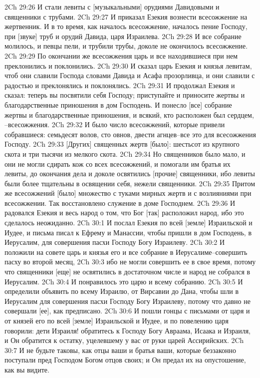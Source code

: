 2Ch 29:26  И стали левиты с [музыкальными] орудиями Давидовыми и священники с трубами.
2Ch 29:27  И приказал Езекия вознести всесожжение на жертвенник. И в то время, как началось всесожжение, началось пение Господу, при [звуке] труб и орудий Давида, царя Израилева.
2Ch 29:28  И все собрание молилось, и певцы пели, и трубили трубы, доколе не окончилось всесожжение.
2Ch 29:29  По окончании же всесожжения царь и все находившиеся при нем преклонились и поклонились.
2Ch 29:30  И сказал царь Езекия и князья левитам, чтоб они славили Господа словами Давида и Асафа прозорливца, и они славили с радостью и преклонялись и поклонялись.
2Ch 29:31  И продолжал Езекия и сказал: теперь вы посвятили себя Господу; приступайте и приносите жертвы и благодарственные приношения в дом Господень. И понесло [все] собрание жертвы и благодарственные приношения, и всякий, кто расположен был сердцем, --всесожжения.
2Ch 29:32  И было число всесожжений, которые привели собравшиеся: семьдесят волов, сто овнов, двести агнцев--все это для всесожжения Господу.
2Ch 29:33  [Других] священных жертв [было]: шестьсот из крупного скота и три тысячи из мелкого скота.
2Ch 29:34  Но священников было мало, и они не могли сдирать кож со всех всесожжений, и помогали им братья их левиты, до окончания дела и доколе освятились [прочие] священники, ибо левиты были более тщательны в освящении себя, нежели священники.
2Ch 29:35  Притом же всесожжений [было] множество с туками мирных жертв и с возлияниями при всесожжении. Так восстановлено служение в доме Господнем.
2Ch 29:36  И радовался Езекия и весь народ о том, что Бог [так] расположил народ, ибо это сделалось неожиданно.
2Ch 30:1  И послал Езекия по всей [земле] Израильской и Иудее, и письма писал к Ефрему и Манассии, чтобы пришли в дом Господень, в Иерусалим, для совершения пасхи Господу Богу Израилеву.
2Ch 30:2  И положили на совете царь и князья его и все собрание в Иерусалиме--совершить пасху во второй месяц,
2Ch 30:3  ибо не могли совершить ее в свое время, потому что священники [еще] не освятились в достаточном числе и народ не собрался в Иерусалим.
2Ch 30:4  И понравилось это царю и всему собранию.
2Ch 30:5  И определили объявить по всему Израилю, от Вирсавии до Дана, чтобы шли в Иерусалим для совершения пасхи Господу Богу Израилеву, потому что давно не совершали [ее], как предписано.
2Ch 30:6  И пошли гонцы с письмами от царя и от князей его по всей [земле] Израильской и Иудее, и по повелению царя говорили: дети Израиля! обратитесь к Господу Богу Авраама, Исаака и Израиля, и Он обратится к остатку, уцелевшему у вас от руки царей Ассирийских.
2Ch 30:7  И не будьте таковы, как отцы ваши и братья ваши, которые беззаконно поступали пред Господом Богом отцов своих; и Он предал их на опустошение, как вы видите.
